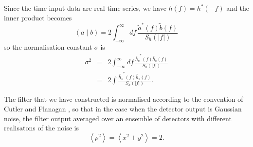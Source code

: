 Since the time input data are real time series, we have $h(f) = h^\ast(-f)$
and the inner product becomes
\begin{equation}
\left(a\mid b\right) = 2 \int_{-\infty}^{\infty}df\,
\frac{\tilde{a}^\ast(f)\tilde{b}(f)}{S_h\left(\left|f\right|\right)}
\end{equation}
so the normalisation constant $\sigma$ is
\begin{eqnarray}
\sigma^2 &=& 2 \int_{-\infty}^{\infty}df\,
\frac{\tilde{h_c}^\ast(f)\tilde{h_c}(f)}{S_h\left(\left|f\right|\right)} \\
&=& 2 \int \frac{\tilde{h_s}^\ast(f)\tilde{h_s}(f)}{S_h\left(\left|f\right|\right)}.
\end{eqnarray}

The filter that we have constructed is normalised according to the convention
of Cutler and Flanagan \cite{cutflan}, so that in the case when the detector
output is Gaussian noise, the filter output averaged over an ensemble of
detectors with different realisatons of the noise is
\begin{equation}
\left\langle \rho^2 \right\rangle = \left\langle x^2 + y^2 \right\rangle = 2.
\end{equation}


